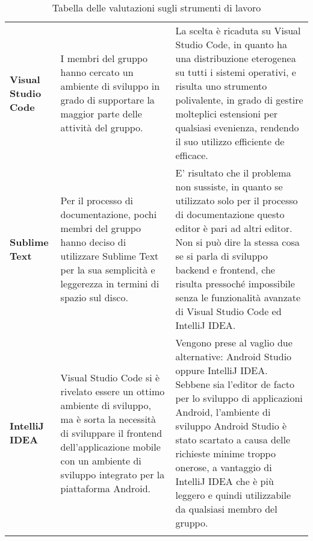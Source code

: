\documentclass[../piano-di-qualifica.tex]{subfiles}
\begin{document}
\begin{longtable}[H]{>{\centering\bfseries}m{3cm} >{\centering\arraybackslash}m{6.5cm} >{\centering\arraybackslash}m{6.8cm}}
  Visual Studio Code                & I membri del gruppo hanno cercato un ambiente di sviluppo in grado di supportare la maggior parte delle attività del gruppo.                                                                                                                                     & La scelta è ricaduta su Visual Studio Code, in quanto ha una distribuzione eterogenea su tutti i sistemi operativi, e risulta uno strumento polivalente, in grado di gestire molteplici estensioni per qualsiasi evenienza, rendendo il suo utilizzo efficiente de efficace.                                                                                      \\
  Sublime Text                      & Per il processo di documentazione, pochi membri del gruppo hanno deciso di utilizzare Sublime Text per la sua semplicità e leggerezza in termini di spazio sul disco.                                                                                            & E' risultato che il problema non sussiste, in quanto se utilizzato solo per il processo di documentazione questo editor è pari ad altri editor. Non si può dire la stessa cosa se si parla di sviluppo backend e frontend, che risulta pressoché impossibile senza le funzionalità avanzate di Visual Studio Code ed IntelliJ IDEA\@.                             \\
  IntelliJ IDEA                     & Visual Studio Code si è rivelato essere un ottimo ambiente di sviluppo, ma è sorta la necessità di sviluppare il frontend dell'applicazione mobile con un ambiente di sviluppo integrato per la piattaforma Android.                                             & Vengono prese al vaglio due alternative: Android Studio oppure IntelliJ IDEA\@. Sebbene sia l'editor de facto per lo sviluppo di applicazioni Android, l'ambiente di sviluppo Android Studio è stato scartato a causa delle richieste minime troppo onerose, a vantaggio di IntelliJ IDEA che è più leggero e quindi utilizzabile da qualsiasi membro del gruppo. \\
  \rowcolor{white}
  \caption{Tabella delle valutazioni sugli strumenti di lavoro}%
  \label{tab:tabella_valutazioni_strumenti}
\end{longtable}
\end{document}
